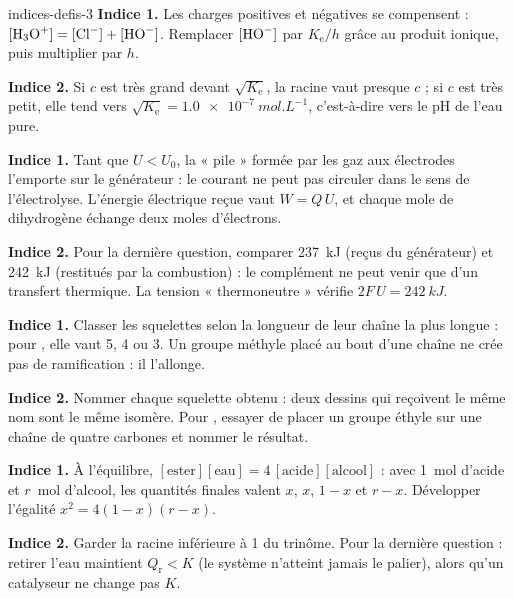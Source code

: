 \begin{blocEdition}{indices-defis-3}
\textbf{Indice 1.} Les charges positives et négatives se compensent : $[\ce{H3O+}]=[\ce{Cl-}]+[\ce{HO-}]$. Remplacer
$[\ce{HO-}]$ par $K_\mathrm{e}/h$ grâce au produit ionique, puis multiplier par $h$.\par\smallskip
\textbf{Indice 2.} Si $c$ est très grand devant $\sqrt{K_\mathrm{e}}$, la racine vaut presque $c$ ; si $c$ est très
petit, elle tend vers $\sqrt{K_\mathrm{e}}=\qty{1,0e-7}{mol.L^{-1}}$, c'est-à-dire vers le pH de l'eau pure.\par\smallskip
{}
\textbf{Indice 1.} Tant que $U<U_0$, la « pile » formée par les gaz aux électrodes l'emporte sur le générateur : le
courant ne peut pas circuler dans le sens de l'électrolyse. L'énergie électrique reçue vaut $W=Q\,U$, et chaque mole de
dihydrogène échange deux moles d'électrons.\par\smallskip
\textbf{Indice 2.} Pour la dernière question, comparer 237~kJ (reçus du générateur) et 242~kJ (restitués par la
combustion) : le complément ne peut venir que d'un transfert thermique. La tension « thermoneutre » vérifie
$2F\,U=\qty{242}{kJ}$.\par\smallskip
{}
\textbf{Indice 1.} Classer les squelettes selon la longueur de leur chaîne la plus longue : pour , elle vaut
5, 4 ou 3. Un groupe méthyle placé au bout d'une chaîne ne crée pas de ramification : il l'allonge.\par\smallskip
\textbf{Indice 2.} Nommer chaque squelette obtenu : deux dessins qui reçoivent le même nom sont le même isomère. Pour
, essayer de placer un groupe éthyle sur une chaîne de quatre carbones et nommer le résultat.\par\smallskip
{}
\textbf{Indice 1.} À l'équilibre, $[\text{ester}][\text{eau}]=4\,[\text{acide}][\text{alcool}]$ : avec 1~mol d'acide et
$r$~mol d'alcool, les quantités finales valent $x$, $x$, $1-x$ et $r-x$. Développer l'égalité $x^2=4(1-x)(r-x)$.\par\smallskip
\textbf{Indice 2.} Garder la racine inférieure à 1 du trinôme. Pour la dernière question : retirer l'eau maintient
$Q_\mathrm{r}<K$ (le système n'atteint jamais le palier), alors qu'un catalyseur ne change pas $K$.\par\smallskip
\end{blocEdition}

